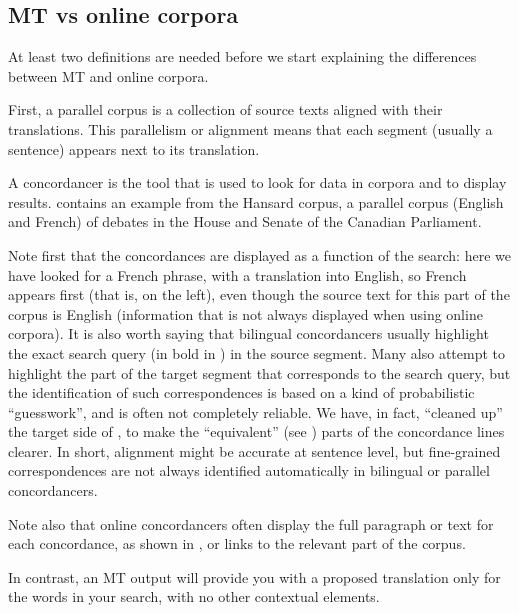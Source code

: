 \documentclass[output=paper,colorlinks,citecolor=brown,
]{langscibook}
\begin{document}
\subsection{MT vs online corpora} 

At least two definitions are needed before we start explaining the differences between MT and online corpora. 

First, a parallel corpus is a collection of source texts aligned with their translations. This parallelism or alignment means that each segment (usually a sentence) appears next to its translation. 

A concordancer is the tool that is used to look for data in corpora and to display results.  contains an example from the Hansard corpus, a parallel corpus (English and French) of debates in the House and Senate of the Canadian Parliament.


Note first that the concordances are displayed as a function of the search: here we have looked for a French phrase, with a translation into English, so French appears first (that is, on the left), even though the source text for this part of the corpus is English (information that is not always displayed when using online corpora). It is also worth saying that bilingual concordancers usually highlight the exact search query (in bold in ) in the source segment. Many also attempt to highlight the part of the target segment that corresponds to the search query, but the identification of such correspondences is based on a kind of probabilistic “guesswork”, and is often not completely reliable. We have, in fact, “cleaned up” the target side of , to make the “equivalent” (see ) parts of the concordance lines clearer. In short, alignment might be accurate at sentence level, but fine-grained correspondences are not always identified automatically in bilingual or parallel concordancers.

Note also that online concordancers often display the full paragraph or text for each concordance, as shown in , or links to the relevant part of the corpus.

In contrast, an MT output will provide you with a proposed translation only for the words in your search, with no other contextual elements. 
\end{document}
